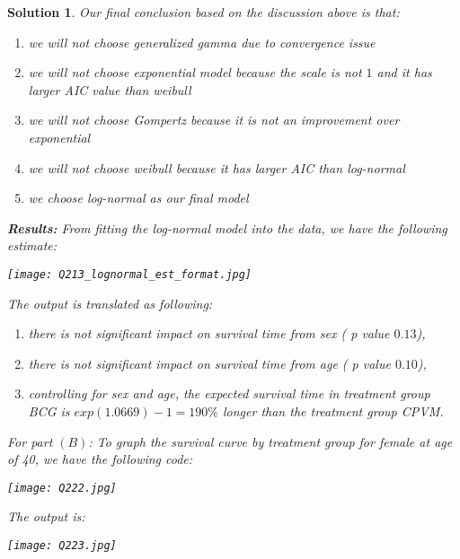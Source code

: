 \documentclass[11pt]{article}
\newtheorem{sol}{Solution}
\begin{document}
\begin{sol}
	Our final conclusion based on the discussion above is that:
	\begin{enumerate}
		\item we will not choose generalized gamma due to convergence issue
		\item we will not choose exponential model because the scale is not $1$ and it has larger AIC value than weibull
		\item we will not choose Gompertz because it is not an improvement over exponential
		\item we will not choose weibull because it has larger AIC than log-normal
		\item we choose log-normal as our final model
	\end{enumerate}
	{\bf Results:}\vskip 2mm
	From fitting the log-normal model into the data, we have the following estimate:
	\begin{center}
		\texttt{[image: Q213\_lognormal\_est\_format.jpg]}
	\end{center}
	The output is translated as following:
	\begin{enumerate}
		\item there is not significant impact on survival time from sex ( p value $0.13$),
		\item there is not significant impact on survival time from age ( p value $0.10$),
		\item controlling for sex and age, the expected survival time in treatment group BCG is $exp(1.0669) -  1 = 190\%$ longer than the treatment group CPVM.
	\end{enumerate}
	For part $(B)$:\vskip 2mm
	To graph the survival curve by treatment group for female at age of 40, we have the following code:
	\begin{center}
		\texttt{[image: Q222.jpg]}
	\end{center}
	The output is:
	\begin{center}
		\texttt{[image: Q223.jpg]}
	\end{center}
\end{sol}
\end{document}
